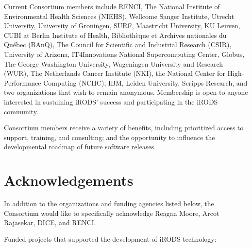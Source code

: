 \documentclass[10pt,oneside]{memoir}
\begin{document}
Current Consortium members include RENCI, The National Institute of Environmental Health Sciences (NIEHS), Wellcome Sanger Institute, Utrecht University, University of Groningen, SURF, Maastricht University, KU Leuven, CUBI at Berlin Institute of Health, Bibliothèque et Archives nationales du Québec (BAnQ), The Council for Scientific and Industrial Research (CSIR), University of Arizona, IT4Innovations National Supercomputing Center, Globus, The George Washington University, Wageningen University and Research (WUR), The Netherlands Cancer Institute (NKI), the National Center for High-Performance Computing (NCHC), IBM, Leiden University, Scripps Research, and two organizations that wish to remain anonymous. Membership is open to anyone interested in sustaining iRODS' success and participating in the iRODS community.

Consortium members receive a variety of benefits, including prioritized access to support, training, and consulting; and the opportunity to influence the developmental roadmap of future software releases.


\newpage
\section{Acknowledgements}

In addition to the organizations and funding agencies listed below, the Consortium would like to specifically acknowledge Reagan Moore, Arcot Rajasekar, DICE, and RENCI.

Funded projects that supported the development of iRODS technology:
\end{document}
